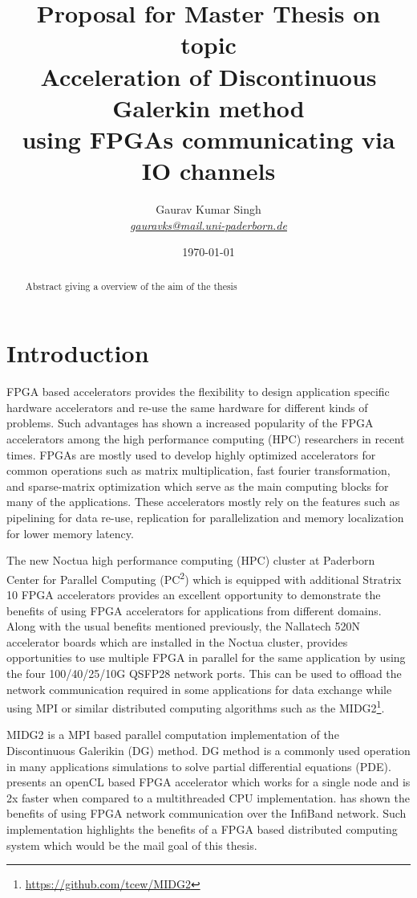 \documentclass[english,notitlepage]{hgbreport}
\author{Gaurav Kumar Singh \\ \textit{\href{mailto:gauravks@mail.uni-paderborn.de}{gauravks@mail.uni-paderborn.de}}}
\title{Proposal for Master Thesis on topic \\
		Acceleration of Discontinuous Galerkin method \\
		using FPGAs communicating via IO channels}
\date{\today}
\begin{document}
\maketitle

\begin{abstract}\noindent
	Abstract giving a overview of the aim of the thesis
\end{abstract}

\section{Introduction}

FPGA based accelerators provides the flexibility to design application specific hardware accelerators and re-use the same
hardware for different kinds of problems. Such advantages has shown a increased popularity of the FPGA accelerators among
the high performance computing (HPC) researchers in recent times. FPGAs are mostly used to develop highly
optimized accelerators for common operations such as matrix multiplication, fast fourier transformation,
and sparse-matrix optimization which serve as the main computing blocks for many of the applications. These accelerators
mostly rely on the features such as pipelining for data re-use, replication for parallelization and memory localization
for lower memory latency.

The new Noctua high performance computing (HPC) cluster at Paderborn Center for Parallel Computing  (PC\textsuperscript{2})
which is equipped with additional Stratrix 10 FPGA accelerators provides an excellent opportunity to demonstrate the benefits
of using FPGA accelerators for applications from different domains. Along with the usual benefits mentioned previously, the
Nallatech 520N accelerator boards which are installed in the Noctua cluster, provides opportunities to use multiple
FPGA in parallel for the same application by using the four 100/40/25/10G QSFP28 network ports. This can be used to offload
the network communication required in some applications for data exchange while using MPI or similar distributed computing
algorithms such as the MIDG2\footnote{\url{https://github.com/tcew/MIDG2}}.

MIDG2 is a MPI based parallel computation implementation of the Discontinuous Galerikin (DG) \cite{hesthaven_nodal_2008} method.
DG method is a commonly used operation in many applications simulations to solve partial differential equations (PDE).
\textcite{kenter_opencl-based_2018} presents an openCL based FPGA accelerator which works for a single node and is 2x faster
when compared to a multithreaded CPU implementation. \textcite{kobayashi_opencl-ready_2018} has shown the benefits of using
FPGA network communication over the InfiBand network. Such implementation highlights the benefits of a FPGA based distributed
computing system which would be the mail goal of this thesis.
\end{document}

